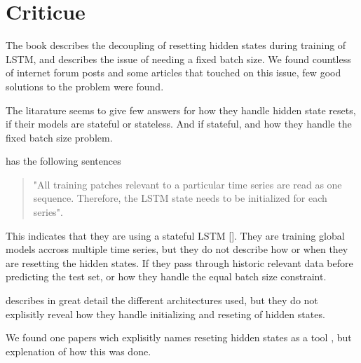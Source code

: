
\section{Criticue}
\label{section:RelatedWork:Criticue}
The book \cite{Bharadi2021} describes the decoupling of resetting hidden
states during training of LSTM, and describes the issue of
needing a fixed batch size. We found countless of internet forum posts
and some articles that touched on this issue, few good solutions
to the problem were found.

The litarature seems to give few answers for how they handle hidden state
resets, if their models are stateful or stateless. And if stateful,
and how they handle the fixed batch size problem.

\cite{Bandara2017} has the following sentences
\begin{quotation}
  "All training patches relevant to a particular time series are read as one
  sequence. Therefore, the LSTM state needs to be initialized for each
  series".

\end{quotation}
This indicates that they are using a stateful LSTM [].
They are training global models accross multiple time series, but they do not
describe how or when they are resetting the hidden states.
If they pass through historic relevant data before predicting
the test set, or how they handle the equal batch size constraint.

\cite{Hewamalage2021} describes in great detail the different architectures used,
but they do not explisitly reveal how they handle initializing and reseting
of hidden states.

We found one papers wich explisitly names reseting hidden states
as a tool \cite{Smyl2020}, but explenation of how this was done.

